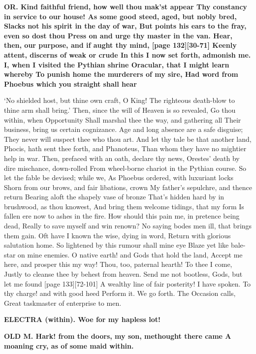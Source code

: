 \documentclass[11pt,letter]{book}
\begin{document}
\par \textbf{OR. Kind faithful friend, how well thou mak’st appear Thy constancy in service to our house! As some good steed, aged, but nobly bred, Slacks not his spirit in the day of war, But points his ears to the fray, even so dost thou Press on and urge thy master in the van. Hear, then, our purpose, and if aught thy mind, [page 132][30-71] Keenly attent, discerns of weak or crude In this I now set forth, admonish me. I, when I visited the Pythian shrine Oracular, that I might learn whereby To punish home the murderers of my sire, Had word from Phoebus which you straight shall hear}
\par   ‘No shielded host, but thine own craft, O King! The righteous death-blow to thine arm shall bring.’ Then, since the will of Heaven is so revealed, Go thou within, when Opportunity Shall marshal thee the way, and gathering all Their business, bring us certain cognizance. Age and long absence are a safe disguise; They never will suspect thee who thou art. And let thy tale be that another land, Phocis, hath sent thee forth, and Phanoteus, Than whom they have no mightier help in war. Then, prefaced with an oath, declare thy news, Orestes’ death by dire mischance, down-rolled From wheel-borne chariot in the Pythian course. So let the fable be devised; while we, As Phoebus ordered, with luxuriant locks Shorn from our brows, and fair libations, crown My father’s sepulchre, and thence return Bearing aloft the shapely vase of bronze That’s hidden hard by in brushwood, as thou knowest, And bring them welcome tidings, that my form Is fallen ere now to ashes in the fire. How should this pain me, in pretence being dead, Really to save myself and win renown? No saying bodes men ill, that brings them gain. Oft have I known the wise, dying in word, Return with glorious salutation home. So lightened by this rumour shall mine eye Blaze yet like bale-star on mine enemies. O native earth! and Gods that hold the land, Accept me here, and prosper this my way! Thou, too, paternal hearth! To thee I come, Justly to cleanse thee by behest from heaven. Send me not bootless, Gods, but let me found [page 133][72-101] A wealthy line of fair posterity! I have spoken. To thy charge! and with good heed Perform it. We go forth. The Occasion calls, Great taskmaster of enterprise to men.

\par \textbf{ELECTRA (within). Woe for my hapless lot!}
\par 

\par \textbf{OLD M. Hark! from the doors, my son, methought there came A moaning cry, as of some maid within.}
\par 
\end{document}
